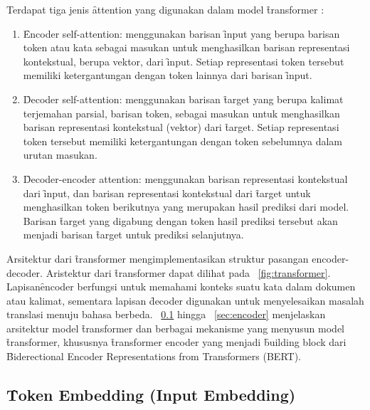 	Terdapat tiga jenis \f{attention} yang digunakan dalam model \f{transformer} \citep{transformerori}:
	\begin{enumerate}
		\item \f{Encoder self-attention}: menggunakan barisan \f{input} yang berupa barisan token atau kata sebagai masukan untuk menghasilkan barisan representasi kontekstual, berupa vektor, dari \f{input}. Setiap representasi token tersebut memiliki ketergantungan dengan token lainnya dari barisan \f{input}.
		\item \f{Decoder self-attention}: menggunakan barisan \f{target} yang berupa kalimat terjemahan parsial, barisan token, sebagai masukan untuk menghasilkan barisan representasi kontekstual (vektor) dari \f{target}. Setiap representasi token tersebut memiliki ketergantungan dengan token sebelumnya dalam urutan masukan.
		\item \f{Decoder-encoder attention}: menggunakan barisan representasi kontekstual dari \f{input}, dan barisan representasi kontekstual dari \f{target} untuk menghasilkan token berikutnya yang merupakan hasil prediksi dari model. Barisan \f{target} yang digabung dengan token hasil prediksi tersebut akan menjadi barisan \f{target} untuk prediksi selanjutnya.
	\end{enumerate}

	Arsitektur dari \f{transformer} mengimplementasikan struktur pasangan encoder-decoder. Aristektur dari \f{transformer} dapat dilihat pada \pic~\ref{fig:transformer}. Lapisan\f{encoder} berfungsi untuk memahami konteks suatu kata dalam dokumen atau kalimat, sementara lapisan \f{decoder} digunakan untuk menyelesaikan masalah translasi menuju bahasa berbeda. \sect~\ref{sec:token-embedding} hingga \sect~\ref{sec:encoder} menjelaskan arsitektur model \f{transformer} dan berbagai mekanisme yang menyusun model \f{transformer}, khususnya \f{transformer encoder} yang menjadi \f{building block} dari \f{Biderectional Encoder Representations from Transformers} (BERT).

	\subsection{\f{Token Embedding (Input Embedding)}}
	\label{sec:token-embedding}


